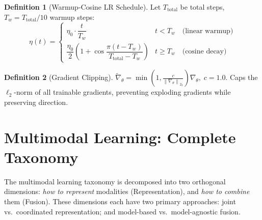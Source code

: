 \documentclass[12pt,a4paper]{article}
\theoremstyle{definition}
\newtheorem{definition}{Definition}[section]
\theoremstyle{plain}
\theoremstyle{remark}
\newcommand{\Norm}[1]{\left\|#1\right\|_2}
\begin{document}
\begin{definition}[Warmup-Cosine LR Schedule]
Let $T_{\text{total}}$ be total steps, $T_w = T_{\text{total}}/10$ warmup steps:
\[
  \eta(t) = \begin{cases}
    \eta_0 \cdot \dfrac{t}{T_w} & t < T_w \quad\text{(linear warmup)}\\[6pt]
    \dfrac{\eta_0}{2}\!\left(1+\cos\dfrac{\pi(t-T_w)}{T_{\text{total}}-T_w}\right) & t \ge T_w \quad\text{(cosine decay)}
  \end{cases}
\]
\end{definition}

\begin{definition}[Gradient Clipping]
$\tilde{\nabla}_\theta = \min\!\left(1, \frac{c}{\Norm{\nabla_\theta}_2}\right)\nabla_\theta,\; c = 1.0$. Caps the $\ell_2$-norm of all trainable gradients, preventing exploding gradients while preserving direction.
\end{definition}

\newpage
\section{Multimodal Learning: Complete Taxonomy}
\label{sec:taxonomy}

The multimodal learning taxonomy is decomposed into two orthogonal dimensions: \emph{how to represent} modalities (Representation), and \emph{how to combine} them (Fusion). These dimensions each have two primary approaches: joint vs.\ coordinated representation; and model-based vs.\ model-agnostic fusion.
\end{document}
